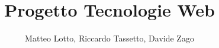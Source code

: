 \documentclass[a4paper,12pt]{article}
\begin{document}
\title{Progetto Tecnologie Web}
\author{Matteo Lotto, Riccardo Tassetto, Davide Zago}
\date{}
\maketitle
\tableofcontents







\end{document}
